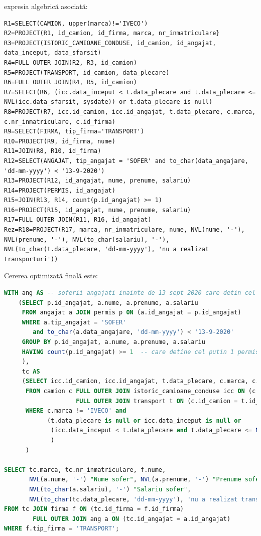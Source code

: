 \documentclass[12pt, a4paper]{article}
\begin{document}
\newpage{} expresia algebrică asociată:
\begin{lstlisting}
R1=SELECT(CAMION, upper(marca)!='IVECO')
R2=PROJECT(R1, id_camion, id_firma, marca, nr_inmatriculare}
R3=PROJECT(ISTORIC_CAMIOANE_CONDUSE, id_camion, id_angajat, data_inceput, data_sfarsit)
R4=FULL OUTER JOIN(R2, R3, id_camion)
R5=PROJECT(TRANSPORT, id_camion, data_plecare)
R6=FULL OUTER JOIN(R4, R5, id_camion)
R7=SELECT(R6, (icc.data_inceput < t.data_plecare and t.data_plecare <= NVL(icc.data_sfarsit, sysdate)) or t.data_plecare is null)
R8=PROJECT(R7, icc.id_camion, icc.id_angajat, t.data_plecare, c.marca, c.nr_inmatriculare, c.id_firma)
R9=SELECT(FIRMA, tip_firma='TRANSPORT')
R10=PROJECT(R9, id_firma, nume)
R11=JOIN(R8, R10, id_firma)
R12=SELECT(ANGAJAT, tip_angajat = 'SOFER' and to_char(data_angajare, 'dd-mm-yyyy') < '13-9-2020')
R13=PROJECT(R12, id_angajat, nume, prenume, salariu)
R14=PROJECT(PERMIS, id_angajat)
R15=JOIN(R13, R14, count(p.id_angajat) >= 1)
R16=PROJECT(R15, id_angajat, nume, prenume, salariu)
R17=FULL OUTER JOIN(R11, R16, id_angajat)
Rez=R18=PROJECT(R17, marca, nr_inmatriculare, nume, NVL(nume, '-'), NVL(prenume, '-'), NVL(to_char(salariu), '-'), NVL(to_char(t.data_plecare, 'dd-mm-yyyy'), 'nu a realizat transporturi'))
\end{lstlisting}

Cererea optimizată finală este:

\begin{lstlisting}[language=SQL]
WITH ang AS -- soferii angajati inainte de 13 sept 2020 care detin cel mult 2 permise auto
    (SELECT p.id_angajat, a.nume, a.prenume, a.salariu
     FROM angajat a JOIN permis p ON (a.id_angajat = p.id_angajat)
     WHERE a.tip_angajat = 'SOFER'
        and to_char(a.data_angajare, 'dd-mm-yyyy') < '13-9-2020' 
     GROUP BY p.id_angajat, a.nume, a.prenume, a.salariu
     HAVING count(p.id_angajat) >= 1  -- care detine cel putin 1 permis  
     ),
     tc AS
     (SELECT icc.id_camion, icc.id_angajat, t.data_plecare, c.marca, c.nr_inmatriculare, c.id_firma
      FROM camion c FULL OUTER JOIN istoric_camioane_conduse icc ON (c.id_camion = icc.id_camion)
                    FULL OUTER JOIN transport t ON (c.id_camion = t.id_camion)
      WHERE c.marca != 'IVECO' and
            (t.data_plecare is null or icc.data_inceput is null or 
             (icc.data_inceput < t.data_plecare and t.data_plecare <= NVL(icc.data_sfarsit, sysdate))
             )
      )
    
SELECT tc.marca, tc.nr_inmatriculare, f.nume, 
       NVL(a.nume, '-') "Nume sofer", NVL(a.prenume, '-') "Prenume sofer", 
       NVL(to_char(a.salariu), '-') "Salariu sofer",
       NVL(to_char(tc.data_plecare, 'dd-mm-yyyy'), 'nu a realizat transporturi') "Data transport" 
FROM tc JOIN firma f ON (tc.id_firma = f.id_firma)
        FULL OUTER JOIN ang a ON (tc.id_angajat = a.id_angajat)
WHERE f.tip_firma = 'TRANSPORT';
\end{lstlisting}
\end{document}
